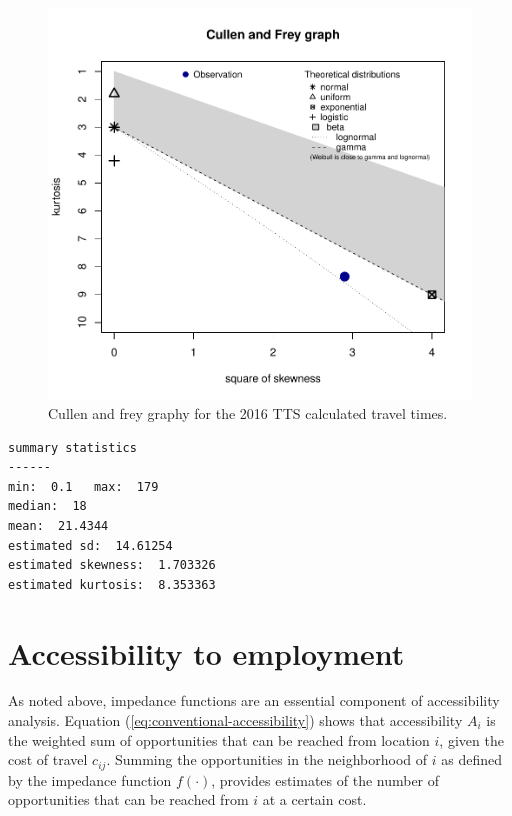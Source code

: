 \documentclass[Royal,times,sageh]{sagej}
\begin{document}
\begin{figure}
\includegraphics[width=1\linewidth]{Manuscript-Data-Package_files/figure-latex/plot-cullen-frey-1} \caption{\label{fig:plot-cullen-frey}Cullen and frey graphy for the 2016 TTS calculated travel times.}\label{fig:plot-cullen-frey}
\end{figure}

\begin{verbatim}
summary statistics
------
min:  0.1   max:  179 
median:  18 
mean:  21.4344 
estimated sd:  14.61254 
estimated skewness:  1.703326 
estimated kurtosis:  8.353363 
\end{verbatim}

\hypertarget{accessibility-to-employment}{%
\section{Accessibility to
employment}\label{accessibility-to-employment}}

As noted above, impedance functions are an essential component of
accessibility analysis. Equation (\ref{eq:conventional-accessibility})
shows that accessibility \(A_i\) is the weighted sum of opportunities
that can be reached from location \(i\), given the cost of travel
\(c_{ij}\). Summing the opportunities in the neighborhood of \(i\) as
defined by the impedance function \(f(\cdot)\), provides estimates of
the number of opportunities that can be reached from \(i\) at a certain
cost.
\end{document}

